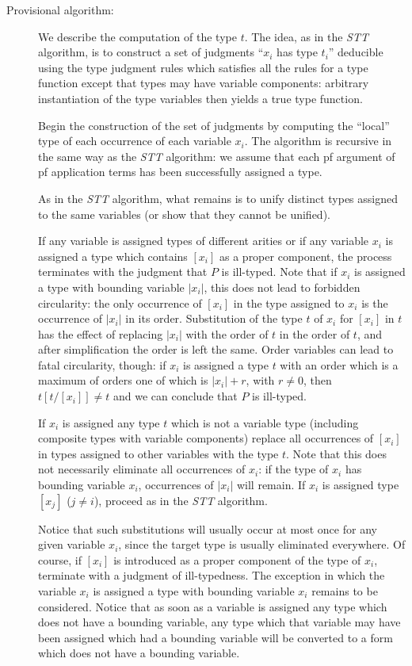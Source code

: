\documentclass{article}
\begin{document}
\begin{description}

\item[Provisional algorithm:] We describe the computation of the type
$t$.  The idea, as in the {\em STT\/} algorithm, is to construct a set
of judgments ``$x_i$ has type $t_i$'' deducible using the type
judgment rules which satisfies all the rules for a type function
except that types may have variable components: arbitrary
instantiation of the type variables then yields a true type function.

Begin the construction of the set of judgments by computing the
``local'' type of each occurrence of each variable $x_i$.  The
algorithm is recursive in the same way as the {\em STT\/} algorithm:
we assume that each pf argument of pf application terms has been
successfully assigned a type.

As in the {\em STT\/} algorithm, what remains is to unify distinct
types assigned to the same variables (or show that they cannot be
unified).

If any variable is assigned types of different arities or if any
variable $x_i$ is assigned a type which contains $[x_i]$ as a proper
component, the process terminates with the judgment that $P$ is
ill-typed.  Note that if $x_i$ is assigned a type with bounding
variable $|x_i|$, this does not lead to forbidden circularity: the
only occurrence of $[x_i]$ in the type assigned to $x_i$ is the
occurrence of $|x_i|$ in its order.  Substitution of the type $t$ of
$x_i$ for $[x_i]$ in $t$ has the effect of replacing $|x_i|$ with the
order of $t$ in the order of $t$, and after simplification the order
is left the same.  Order variables can lead to fatal circularity,
though: if $x_i$ is assigned a type $t$ with an order which is a
maximum of orders one of which is $|x_i|+r$, with $r \neq 0$, then
$t[t/[x_i]] \neq t$ and we can conclude that $P$ is ill-typed.

If $x_i$ is assigned any type $t$ which is not a variable type
(including composite types with variable components) replace all
occurrences of $[x_i]$ in types assigned to other variables with the
type $t$.  Note that this does not necessarily eliminate all
occurrences of $x_i$: if the type of $x_i$ has bounding variable
$x_i$, occurrences of $|x_i|$ will remain.  If $x_i$ is assigned type
$[x_j]$ ($j \neq i$), proceed as in the {\em STT\/} algorithm.

Notice that such substitutions will usually occur at most once for any
given variable $x_i$, since the target type is usually eliminated
everywhere.  Of course, if $[x_i]$ is introduced as a proper component
of the type of $x_i$, terminate with a judgment of ill-typedness.  The
exception in which the variable $x_i$ is assigned a type with bounding
variable $x_i$ remains to be considered.  Notice that as soon as a
variable is assigned any type which does not have a bounding variable,
any type which that variable may have been assigned which had a
bounding variable will be converted to a form which does not have a
bounding variable.


\end{description}
\end{document}
